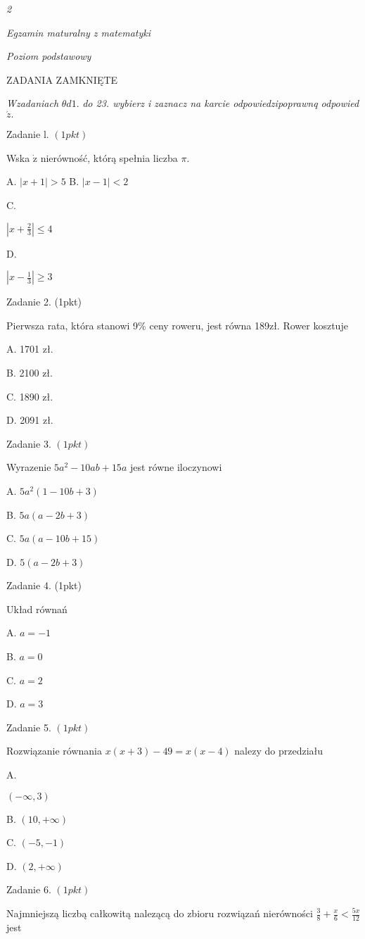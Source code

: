 \documentclass[a4paper,12pt]{article}
\begin{document}
{\it 2}

{\it Egzamin maturalny z matematyki}

{\it Poziom podstawowy}

ZADANIA ZAMKNIĘTE

{\it Wzadaniach} $\theta d1.$ {\it do 23. wybierz i zaznacz na karcie odpowiedzipoprawnq odpowied} $\acute{z}.$

Zadanie l. $(1pkt)$

Wska $\dot{\mathrm{z}}$ nierówność, którą spełnia liczba $\pi.$

A. $|x+1|>5$ B. $|x-1|<2$

C.

$|x+\displaystyle \frac{2}{3}|\leq 4$

D.

$|x-\displaystyle \frac{1}{3}|\geq 3$

Zadanie 2. (1pkt)

Pierwsza rata, która stanowi 9\% ceny roweru, jest równa 189zł. Rower kosztuje

A. 1701 zł.

B. 2100 zł.

C. 1890 zł.

D. 2091 zł.

Zadanie 3. $(1pkt)$

Wyrazenie $5a^{2}-10ab+15a$ jest równe iloczynowi

A. $5a^{2}(1-10b+3)$

B. $5a(a-2b+3)$

C. $5a(a-10b+15)$

D. $5(a-2b+3)$

Zadanie 4. (1pkt)

Układ równań 

A. $a=-1$

B. $a=0$

C. $a=2$

D. $a=3$

Zadanie 5. $(1pkt)$

Rozwiązanie równania $x(x+3)-49=x(x-4)$ nalezy do przedziału

A.

$(-\infty,3)$

B. $(10,+\infty)$

C. $(-5,-1)$

D. $(2,+\infty)$

Zadanie 6. $(1pkt)$

Najmniejszą liczbą całkowitą nalezącą do zbioru rozwiązań nierówności $\displaystyle \frac{3}{8}+\frac{x}{6}<\frac{5x}{12}$ jest
\end{document}
